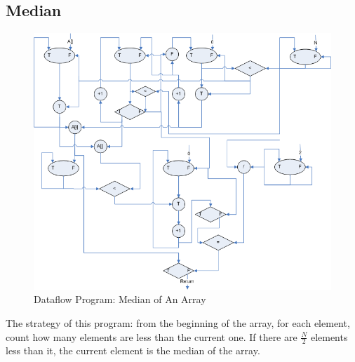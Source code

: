 \documentclass[12pt]{article}
\begin{document}
\subsection{Median}
\begin{figure}[h!]
	\begin{center}
		\includegraphics[width=1.1\textwidth, angle=0]{median.png}
		\caption{\label{fig:median}Dataflow Program: Median of An Array}
	\end{center}
\end{figure}
The strategy of this program: from the beginning of the array, for each
element, count how many elements are less than the current one. If there 
are $\frac{N}{2}$ elements less than it, the current element is the median 
of the array.
\end{document}
